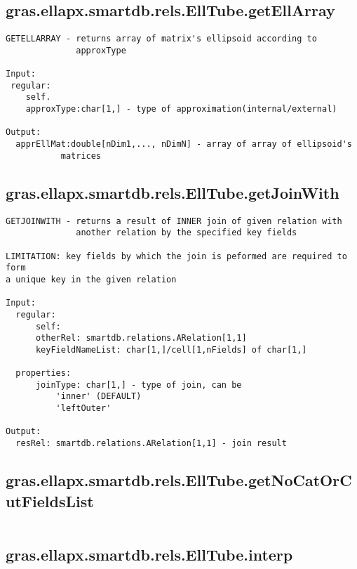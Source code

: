 \subsection{\texorpdfstring{gras.ellapx.smartdb.rels.EllTube.getEllArray}{getEllArray}}\label{method:gras.ellapx.smartdb.rels.EllTube.getEllArray}
\begin{verbatim}
GETELLARRAY - returns array of matrix's ellipsoid according to
              approxType

Input:
 regular:
    self.
    approxType:char[1,] - type of approximation(internal/external)

Output:
  apprEllMat:double[nDim1,..., nDimN] - array of array of ellipsoid's
           matrices
\end{verbatim}
\subsection{\texorpdfstring{gras.ellapx.smartdb.rels.EllTube.getJoinWith}{getJoinWith}}\label{method:gras.ellapx.smartdb.rels.EllTube.getJoinWith}
\begin{verbatim}
GETJOINWITH - returns a result of INNER join of given relation with
              another relation by the specified key fields

LIMITATION: key fields by which the join is peformed are required to form
a unique key in the given relation

Input:
  regular:
      self:
      otherRel: smartdb.relations.ARelation[1,1]
      keyFieldNameList: char[1,]/cell[1,nFields] of char[1,]

  properties:
      joinType: char[1,] - type of join, can be
          'inner' (DEFAULT)
          'leftOuter'

Output:
  resRel: smartdb.relations.ARelation[1,1] - join result
\end{verbatim}
\subsection{\texorpdfstring{gras.ellapx.smartdb.rels.EllTube.getNoCatOrCutFieldsList}{getNoCatOrCutFieldsList}}\label{method:gras.ellapx.smartdb.rels.EllTube.getNoCatOrCutFieldsList}
\begin{verbatim}

\end{verbatim}
\subsection{\texorpdfstring{gras.ellapx.smartdb.rels.EllTube.interp}{interp}}\label{method:gras.ellapx.smartdb.rels.EllTube.interp}
\begin{verbatim}

\end{verbatim}
